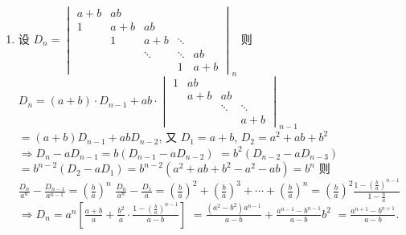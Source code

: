 \begin{enumerate}
			\item %
			      设 $D_n = \begin{vmatrix}
					      a+b & ab  &        &        &     \\
					      1   & a+b & ab     &        &     \\
					          & 1   & a+b    & \ddots &     \\
					          &     & \ddots & \ddots & ab  \\
					          &     &        & 1      & a+b
				      \end{vmatrix}_n$
			      则 $D_n = (a+b) \cdot D_{n-1} + ab \cdot \begin{vmatrix}
					      1 & ab  &        &        \\
					        & a+b & ab     &        \\
					        &     & \ddots & \ddots \\
					        &     &        & a+b
				      \end{vmatrix}_{n-1}$
			      $= (a+b)D_{n-1} + abD_{n-2}$, 又 $D_1 = a+b$, $D_2 = a^2+ab+b^2$
			      $\Rightarrow D_n - aD_{n-1} = b(D_{n-1} - aD_{n-2})$
			      $= b^2(D_{n-2} - aD_{n-3})$
			      $= b^{n-2}(D_2 - aD_1) = b^{n-2}(a^2+ab+b^2 - a^2 - ab) = b^n$
			      则 $\frac{D_n}{a^n} - \frac{D_{n-1}}{a^{n-1}} = \left(\frac{b}{a}\right)^n$
			      $\frac{D_n}{a^n} - \frac{D_1}{a} = \left(\frac{b}{a}\right)^2 + \left(\frac{b}{a}\right)^3 + \cdots + \left(\frac{b}{a}\right)^n = \left(\frac{b}{a}\right)^2 \frac{1-\left(\frac{b}{a}\right)^{n-1}}{1-\frac{b}{a}}$
			      $\Rightarrow D_n = a^n \left[ \frac{a+b}{a} + \frac{b^2}{a} \cdot \frac{1-\left(\frac{b}{a}\right)^{n-1}}{a-b} \right]$
			      $= \frac{(a^2-b^2)a^{n-1}}{a-b} + \frac{a^{n-1}-b^{n-1}}{a-b}b^2$
			      $= \frac{a^{n+1}-b^{n+1}}{a-b}$.
		\end{enumerate}


